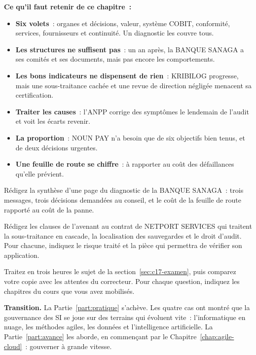 \begin{boxresume}
\textbf{Ce qu'il faut retenir de ce chapitre~:}
\begin{itemize}
    \item \textbf{Six volets}~: organes et décisions, valeur, système COBIT,
          conformité, services, fournisseurs et continuité. Un diagnostic
          les couvre tous.
    \item \textbf{Les structures ne suffisent pas}~: un an après, la BANQUE
          SANAGA a ses comités et ses documents, mais pas encore les
          comportements.
    \item \textbf{Les bons indicateurs ne dispensent de rien}~: KRIBILOG
          progresse, mais une sous-traitance cachée et une revue de
          direction négligée menacent sa certification.
    \item \textbf{Traiter les causes}~: l'ANPP corrige des symptômes le
          lendemain de l'audit et voit les écarts revenir.
    \item \textbf{La proportion}~: NOUN PAY n'a besoin que de six objectifs
          bien tenus, et de deux décisions urgentes.
    \item \textbf{Une feuille de route se chiffre}~: à rapporter au coût des
          défaillances qu'elle prévient.
\end{itemize}
\end{boxresume}

\bigskip

\begin{boxexo}[title={\ding{45}\quad Exercice~17.1. Le rapport de la BANQUE SANAGA \niveaubase}]
Rédigez la synthèse d'une page du diagnostic de la BANQUE SANAGA~: trois
messages, trois décisions demandées au conseil, et le coût de la feuille
de route rapporté au coût de la panne.
\end{boxexo}

\begin{boxexo}[title={\ding{45}\quad Exercice~17.2. L'avenant de KRIBILOG \niveaumoyen}]
Rédigez les clauses de l'avenant au contrat de NETPORT SERVICES qui
traitent la sous-traitance en cascade, la localisation des sauvegardes et
le droit d'audit. Pour chacune, indiquez le risque traité et la pièce qui
permettra de vérifier son application.
\end{boxexo}

\begin{boxexo}[title={\ding{45}\quad Exercice~17.3. Traiter le sujet d'examen \niveauexpert}]
Traitez en trois heures le sujet de la section~\ref{sec:c17-examen}, puis
comparez votre copie avec les attentes du correcteur. Pour chaque
question, indiquez les chapitres du cours que vous avez mobilisés.
\end{boxexo}

\bigskip

\begin{boxinfo}
\textbf{Transition.} La Partie~\ref{part:pratique} s'achève. Les quatre cas
ont montré que la gouvernance des SI se joue sur des terrains qui
évoluent vite~: l'informatique en nuage, les méthodes agiles, les données
et l'intelligence artificielle. La Partie~\ref{part:avance} les aborde,
en commençant par le Chapitre~\ref{chap:agile-cloud}~: gouverner à grande
vitesse.
\end{boxinfo}
